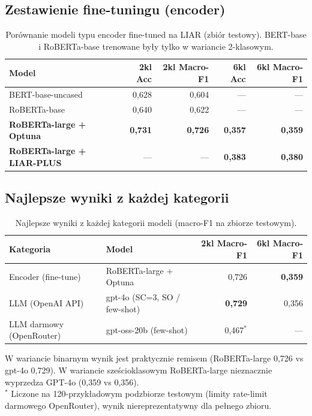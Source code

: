 \documentclass[11pt,a4paper]{article}
\begin{document}
\subsection{Zestawienie fine-tuningu (encoder)}\label{sec:encoder_summary}

\begin{table}[h]
\centering
\caption{Porównanie modeli typu encoder fine-tuned na LIAR (zbiór testowy).
BERT-base i RoBERTa-base trenowane były tylko w wariancie 2-klasowym.}
\label{tab:encoder_summary}
\begin{tabular}{lrrrr}
\toprule
Model & 2kl Acc & 2kl Macro-F1 & 6kl Acc & 6kl Macro-F1 \\
\midrule
BERT-base-uncased                & 0{,}628 & 0{,}604 & --- & --- \\
RoBERTa-base                     & 0{,}640 & 0{,}622 & --- & --- \\
\textbf{RoBERTa-large + Optuna}  & \textbf{0{,}731} & \textbf{0{,}726} & \textbf{0{,}357} & \textbf{0{,}359} \\
\textbf{RoBERTa-large + LIAR-PLUS} & --- & --- & \textbf{0{,}383} & \textbf{0{,}380} \\
\bottomrule
\end{tabular}
\end{table}

\subsection{Najlepsze wyniki z każdej kategorii}\label{sec:best_of}

\begin{table}[h]
\centering
\caption{Najlepsze wyniki z każdej kategorii modeli (macro-F1 na zbiorze testowym).}
\label{tab:best_of}
\begin{tabular}{llrr}
\toprule
Kategoria & Model & 2kl Macro-F1 & 6kl Macro-F1 \\
\midrule
Encoder (fine-tune) & RoBERTa-large + Optuna             & 0{,}726          & \textbf{0{,}359} \\
LLM (OpenAI API)    & gpt-4o (SC=3, SO / few-shot)       & \textbf{0{,}729} & 0{,}356 \\
LLM darmowy (OpenRouter) & gpt-oss-20b (few-shot)         & 0{,}467$^{*}$    & --- \\
\bottomrule
\end{tabular}
\end{table}

W wariancie binarnym wynik jest praktycznie remisem
(RoBERTa-large 0{,}726 vs gpt-4o 0{,}729). W wariancie sześcioklasowym
RoBERTa-large nieznacznie wyprzedza GPT-4o (0{,}359 vs 0{,}356).
\\
$^{*}$ Liczone na 120-przykładowym podzbiorze testowym (limity rate-limit
darmowego OpenRouter), wynik niereprezentatywny dla pełnego zbioru.
\end{document}
